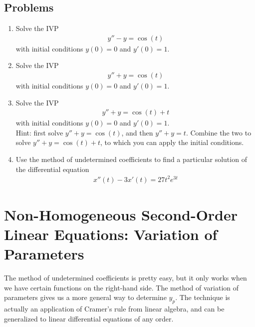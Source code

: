 \documentclass{book}
\begin{document}
\section{Problems}

\begin{enumerate}

\item
  Solve the IVP
  \begin{align*}
  y'' - y = \cos(t)
  \end{align*}
  with initial conditions $y(0)=0$ and $y'(0)=1$.

\item
  Solve the IVP
  \begin{align*}
  y'' + y = \cos(t)
  \end{align*}
  with initial conditions $y(0)=0$ and $y'(0)=1$.

\item
  Solve the IVP
  \begin{align*}
  y'' + y = \cos(t) + t
  \end{align*}
  with initial conditions $y(0)=0$ and $y'(0)=1$.\\
  Hint: first solve $y'' + y = \cos(t)$, and then $y'' + y = t$. Combine
  the two to solve $y'' + y = \cos(t) + t$, to which you can apply the
  initial conditions.

\item
  Use the method of undetermined coefficients to find a particular solution of
  the differential equation
  \begin{align*}
  x''(t) - 3x'(t) = 27t^2e^{3t}
  \end{align*}

\end{enumerate}


\chapter{Non-Homogeneous Second-Order Linear Equations: Variation of Parameters}
The method of undetermined coefficients is pretty easy, but it only works
when we have certain functions on the right-hand side. The method of
variation of parameters gives us a more general way to determine $y_p$.
The technique is actually an application of Cramer's rule from linear algebra,
and can be generalized to linear differential equations of any order.
\end{document}
